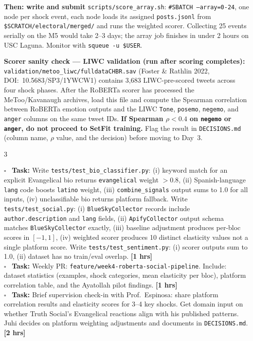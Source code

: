 \documentclass[11pt]{article}
\newcommand{\hrs}[1]{\textbf{[#1 hrs]}}
\newcommand{\task}[2]{%
  \noindent\textbf{Task:} #1 \hfill \hrs{#2}\\}
\newcommand{\done}{\textcolor{sectionblue}{$\square$}\ }
\begin{document}
\begin{taskbox}
{  \textbf{Then: write and submit} \texttt{scripts/score\_array.sh}:
  \texttt{\#SBATCH --array=0-24}, one node per shock event, each node
  loads its assigned \texttt{posts.jsonl} from
  \texttt{\$SCRATCH/electoral/merged/} and runs the weighted scorer.
  Collecting 25 events serially on the M5 would take 2--3 days; the array
  job finishes in under 2 hours on USC Laguna.
  Monitor with \texttt{squeue -u \$USER}.

  \textbf{Scorer sanity check --- LIWC validation (run after scoring completes):}
  \texttt{validation/metoo\_liwc/fulldataCHBR.sav} (Foster \& Rathlin 2022,
  DOI:~10.5683/SP3/1YWCW1) contains 3,683 LIWC-pre-scored tweets across four
  shock phases. After the RoBERTa scorer has processed the MeToo/Kavanaugh
  archives, load this file and compute the Spearman correlation between
  RoBERTa emotion outputs and the LIWC \texttt{Tone}, \texttt{posemo},
  \texttt{negemo}, and \texttt{anger} columns on the same tweet IDs.
  \textbf{If Spearman $\rho < 0.4$ on \texttt{negemo} or \texttt{anger}, do
  not proceed to SetFit training.} Flag the result in \texttt{DECISIONS.md}
  (column name, $\rho$ value, and the decision) before moving to Day~3.}{3}

\done \task{Write \texttt{tests/test\_bio\_classifier.py}: (i) keyword match
  for an explicit Evangelical bio returns \texttt{evangelical} weight $> 0.8$,
  (ii) Spanish-language \texttt{lang} code boosts \texttt{latino} weight,
  (iii) \texttt{combine\_signals} output sums to 1.0 for all inputs,
  (iv) unclassifiable bio returns platform fallback. Write
  \texttt{tests/test\_social.py}: (i) \texttt{BlueSkyCollector} records include
  \texttt{author.description} and \texttt{lang} fields, (ii) \texttt{ApifyCollector}
  output schema matches \texttt{BlueSkyCollector} exactly, (iii) baseline
  adjustment produces per-bloc scores in $[-1, 1]$, (iv) weighted scorer
  produces 10 distinct elasticity values not a single platform score.
  Write \texttt{tests/test\_sentiment.py}: (i) scorer outputs sum to 1.0,
  (ii) dataset has no train/eval overlap.}{1}

\done \task{Weekly PR: \texttt{feature/week4-roberta-social-pipeline}. Include:
  dataset statistics (examples, shock categories, mean elasticity per bloc),
  platform correlation table, and the Ayatollah pilot findings.}{1}

\done \task{Brief supervision check-in with Prof.\ Espinosa: share platform
  correlation results and elasticity scores for 3--4 key shocks. Get domain
  input on whether Truth Social's Evangelical reactions align with his
  published patterns. Juhi decides on platform weighting adjustments and
  documents in \texttt{DECISIONS.md}.}{2}
\end{taskbox}
\end{document}
